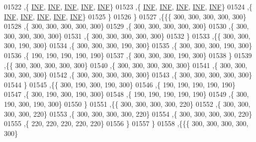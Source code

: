 \begin{DoxyCode}
01522    ,\{   \mbox{\hyperlink{1_88_84__epars_8h_a12c2040f25d8e3a7b9e1c2024c618cb6}{INF}},   \mbox{\hyperlink{1_88_84__epars_8h_a12c2040f25d8e3a7b9e1c2024c618cb6}{INF}},   \mbox{\hyperlink{1_88_84__epars_8h_a12c2040f25d8e3a7b9e1c2024c618cb6}{INF}},   \mbox{\hyperlink{1_88_84__epars_8h_a12c2040f25d8e3a7b9e1c2024c618cb6}{INF}},   \mbox{\hyperlink{1_88_84__epars_8h_a12c2040f25d8e3a7b9e1c2024c618cb6}{INF}}\}
01523    ,\{   \mbox{\hyperlink{1_88_84__epars_8h_a12c2040f25d8e3a7b9e1c2024c618cb6}{INF}},   \mbox{\hyperlink{1_88_84__epars_8h_a12c2040f25d8e3a7b9e1c2024c618cb6}{INF}},   \mbox{\hyperlink{1_88_84__epars_8h_a12c2040f25d8e3a7b9e1c2024c618cb6}{INF}},   \mbox{\hyperlink{1_88_84__epars_8h_a12c2040f25d8e3a7b9e1c2024c618cb6}{INF}},   \mbox{\hyperlink{1_88_84__epars_8h_a12c2040f25d8e3a7b9e1c2024c618cb6}{INF}}\}
01524    ,\{   \mbox{\hyperlink{1_88_84__epars_8h_a12c2040f25d8e3a7b9e1c2024c618cb6}{INF}},   \mbox{\hyperlink{1_88_84__epars_8h_a12c2040f25d8e3a7b9e1c2024c618cb6}{INF}},   \mbox{\hyperlink{1_88_84__epars_8h_a12c2040f25d8e3a7b9e1c2024c618cb6}{INF}},   \mbox{\hyperlink{1_88_84__epars_8h_a12c2040f25d8e3a7b9e1c2024c618cb6}{INF}},   \mbox{\hyperlink{1_88_84__epars_8h_a12c2040f25d8e3a7b9e1c2024c618cb6}{INF}}\}
01525    \}
01526   \}
01527  ,\{\{\{   300,   300,   300,   300,   300\}
01528    ,\{   300,   300,   300,   300,   300\}
01529    ,\{   300,   300,   300,   300,   300\}
01530    ,\{   300,   300,   300,   300,   300\}
01531    ,\{   300,   300,   300,   300,   300\}
01532    \}
01533   ,\{\{   300,   300,   300,   190,   300\}
01534    ,\{   300,   300,   300,   190,   300\}
01535    ,\{   300,   300,   300,   190,   300\}
01536    ,\{   190,   190,   190,   190,   190\}
01537    ,\{   300,   300,   300,   190,   300\}
01538    \}
01539   ,\{\{   300,   300,   300,   300,   300\}
01540    ,\{   300,   300,   300,   300,   300\}
01541    ,\{   300,   300,   300,   300,   300\}
01542    ,\{   300,   300,   300,   300,   300\}
01543    ,\{   300,   300,   300,   300,   300\}
01544    \}
01545   ,\{\{   300,   190,   300,   190,   300\}
01546    ,\{   190,   190,   190,   190,   190\}
01547    ,\{   300,   190,   300,   190,   300\}
01548    ,\{   190,   190,   190,   190,   190\}
01549    ,\{   300,   190,   300,   190,   300\}
01550    \}
01551   ,\{\{   300,   300,   300,   300,   220\}
01552    ,\{   300,   300,   300,   300,   220\}
01553    ,\{   300,   300,   300,   300,   220\}
01554    ,\{   300,   300,   300,   300,   220\}
01555    ,\{   220,   220,   220,   220,   220\}
01556    \}
01557   \}
01558  ,\{\{\{   300,   300,   300,   300,   300\}

\end{DoxyCode}
